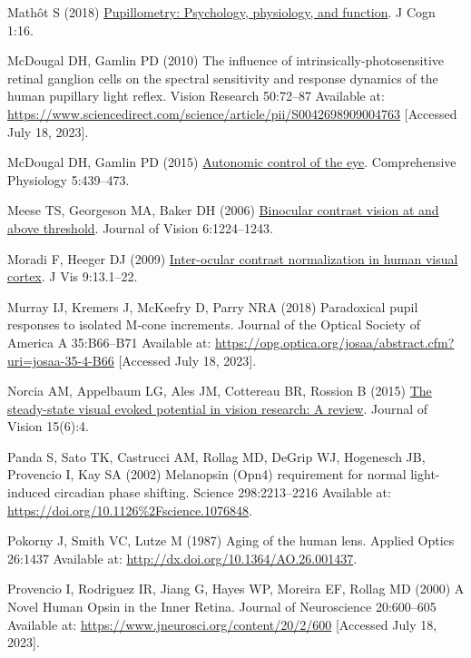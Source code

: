 \documentclass[
]{article}
\newlength{\cslhangindent}
\newenvironment{CSLReferences}[2] %
 {\begin{list}{}{%
  \setlength{\itemindent}{0pt}
  \setlength{\leftmargin}{0pt}
  \setlength{\parsep}{0pt}
  \ifodd #1
   \setlength{\leftmargin}{\cslhangindent}
   \setlength{\itemindent}{-1\cslhangindent}
  \fi
  \setlength{\itemsep}{#2\baselineskip}}}
 {\end{list}}
\begin{document}
\begin{CSLReferences}{1}{1}
Mathôt S (2018) \href{https://doi.org/10.5334/joc.18}{Pupillometry: Psychology, physiology, and function}. J Cogn 1:16.

McDougal DH, Gamlin PD (2010) The influence of intrinsically-photosensitive retinal ganglion cells on the spectral sensitivity and response dynamics of the human pupillary light reflex. Vision Research 50:72--87 Available at: \url{https://www.sciencedirect.com/science/article/pii/S0042698909004763} {[}Accessed July 18, 2023{]}.

McDougal DH, Gamlin PD (2015) \href{https://doi.org/10.1002/cphy.c140014}{Autonomic control of the eye}. Comprehensive Physiology 5:439--473.

Meese TS, Georgeson MA, Baker DH (2006) \href{https://doi.org/10.1167/6.11.7}{Binocular contrast vision at and above threshold}. Journal of Vision 6:1224--1243.

Moradi F, Heeger DJ (2009) \href{https://doi.org/10.1167/9.3.13}{Inter-ocular contrast normalization in human visual cortex}. J Vis 9:13.1--22.

Murray IJ, Kremers J, McKeefry D, Parry NRA (2018) Paradoxical pupil responses to isolated {M}-cone increments. Journal of the Optical Society of America A 35:B66--B71 Available at: \url{https://opg.optica.org/josaa/abstract.cfm?uri=josaa-35-4-B66} {[}Accessed July 18, 2023{]}.

Norcia AM, Appelbaum LG, Ales JM, Cottereau BR, Rossion B (2015) \href{https://doi.org/10.1167/15.6.4}{The steady-state visual evoked potential in vision research: A review}. Journal of Vision 15(6):4.

Panda S, Sato TK, Castrucci AM, Rollag MD, DeGrip WJ, Hogenesch JB, Provencio I, Kay SA (2002) Melanopsin (Opn4) requirement for normal light-induced circadian phase shifting. Science 298:2213--2216 Available at: \url{https://doi.org/10.1126\%2Fscience.1076848}.

Pokorny J, Smith VC, Lutze M (1987) Aging of the human lens. Applied Optics 26:1437 Available at: \url{http://dx.doi.org/10.1364/AO.26.001437}.

Provencio I, Rodriguez IR, Jiang G, Hayes WP, Moreira EF, Rollag MD (2000) A {Novel} {Human} {Opsin} in the {Inner} {Retina}. Journal of Neuroscience 20:600--605 Available at: \url{https://www.jneurosci.org/content/20/2/600} {[}Accessed July 18, 2023{]}.


\end{CSLReferences}
\end{document}
